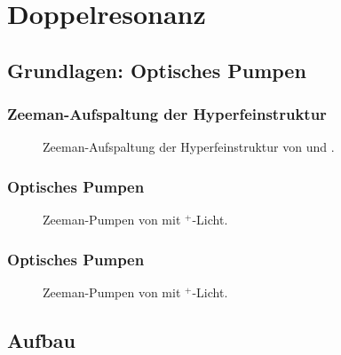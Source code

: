 
\section{Doppelresonanz}
\subsection{Grundlagen: Optisches Pumpen}


\begin{frame}
\frametitle{Zeeman-Aufspaltung der Hyperfeinstruktur}


\begin{figure}
    \centering
    \def\svgwidth{\textwidth}
    
    \caption{Zeeman-Aufspaltung der Hyperfeinstruktur von  und .}
\end{figure}

\end{frame}



\begin{frame}
\frametitle{Optisches Pumpen}

\begin{figure}
   \centering
    \def\svgwidth{\textwidth}
    
    \caption{Zeeman-Pumpen von  mit \textsigma$^+$-Licht.}
\end{figure}

\end{frame}




\begin{frame}[noframenumbering]
\frametitle{Optisches Pumpen}

\addtocounter{figure}{-1}
\begin{figure}
   \centering
    \def\svgwidth{\textwidth}
    
    \caption{Zeeman-Pumpen von  mit \textsigma$^+$-Licht.}
\end{figure}


\end{frame}


\subsection{Aufbau}


